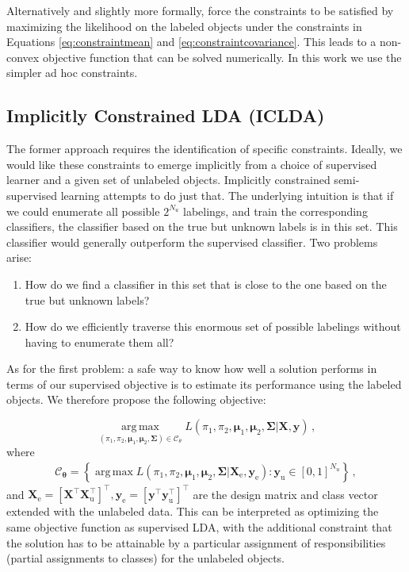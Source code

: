 \documentclass[twoside]{memoir}\usepackage[]{graphicx}\usepackage{xcolor}
\begin{document}
Alternatively and slightly more formally, \citet{Loog2012b} force the constraints to be satisfied by maximizing the likelihood on the labeled objects under the constraints in Equations \eqref{eq:constraintmean} and \eqref{eq:constraintcovariance}. This leads to a non-convex objective function that can be solved numerically. In this work we use the simpler ad hoc constraints.

\subsection{Implicitly Constrained LDA (ICLDA)}
The former approach requires the identification of specific constraints. Ideally, we would like these constraints to emerge implicitly from a choice of supervised learner and a given set of unlabeled objects. Implicitly constrained semi-supervised learning attempts to do just that. The underlying intuition is that if we could enumerate all possible $2^{N_u}$ labelings, and train the corresponding classifiers, the classifier based on the true but unknown labels is in this set. This classifier would generally outperform the supervised classifier. Two problems arise:

\begin{enumerate}
\item How do we find a classifier in this set that is close to the one based on the true but unknown labels?
\item How do we efficiently traverse this enormous set of possible labelings without having to enumerate them all?
\end{enumerate}
As for the first problem: a safe way to know how well a solution performs in terms of our supervised objective is to estimate its performance using the labeled objects. We therefore propose the following objective:

\begin{equation}
\label{eq:iclda}
\operatorname*{arg\,max}_{\left( \pi_1,\pi_2, \boldsymbol{\mu}_1,\boldsymbol{\mu}_2,\mathbf{\Sigma}\right) \in \mathcal{C}_\theta} L(\pi_1,\pi_2, \boldsymbol{\mu}_1,\boldsymbol{\mu}_2,\mathbf{\Sigma}|\mathbf{X},\mathbf{y}) \,,
\end{equation}
where
\begin{align}
\mathcal{C}_{\boldsymbol{\theta}} = \left\{ \operatorname*{arg\,max} L(\pi_1,\pi_2, \boldsymbol{\mu}_1,\boldsymbol{\mu}_2,\mathbf{\Sigma}| \mathbf{X}_\textrm{e}, \mathbf{y}_\textrm{e}) : \mathbf{y}_\textrm{u} \in [0,1]^{N_u} \right\} \,, \nonumber
\end{align}
and $\mathbf{X}_\textrm{e}=[\mathbf{X}^\top \mathbf{X}_\textrm{u}^\top]^\top, \mathbf{y}_\textrm{e}=[\mathbf{y}^\top \mathbf{y}_\textrm{u}^\top]^\top$ are the design matrix and class vector extended with the unlabeled data. This can be interpreted as optimizing the same objective function as supervised LDA, with the additional constraint that the solution has to be attainable by a particular assignment of responsibilities (partial assignments to classes) for the unlabeled objects.
\end{document}
